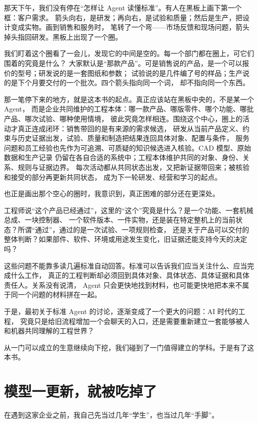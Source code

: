那天下午，我们没有停在“怎样让 Agent 读懂标准”。有人在黑板上画下第一个框：客户需求。
箭头向右，是研发；再向右，是试验和质量；然后是生产，把设计变成实物。画到销售和服务时，
笔转了一个弯——市场反馈和现场问题，箭头掉头指回研发。黑板上出现了一个圈。

我们盯着这个圈看了一会儿，发现它的中间是空的。每一个部门都在圈上，可它们围着的究竟是什么？
大家默认是“那款产品”。可是销售说的产品，是一个可以报价的型号；研发说的是一套图纸和参数；
试验说的是几件编了号的样品；生产说的是下个月要交付的一个批次。四个箭头指向同一个词，
却不指向同一个东西。

那一笔停下来的地方，就是这本书的起点。真正应该站在黑板中央的，不是某一个 Agent，
而是企业共同维护的工程本体：哪一款产品、哪版零件、哪个功能、哪批产品、哪次试验、哪种使用情境，
彼此究竟怎样相连。围绕这个中心，圈上的活动才真正连成闭环：销售带回的是有来源的需求候选，
研发从当前产品定义、约束与历史证据出发，试验、质量和制造把结果连回具体对象、配置与条件，
服务问题和员工经验也先作为可追溯、可质疑的知识候选进入核验。CAD 模型、原始数据和生产记录
仍留在各自合适的系统中；工程本体维护共同的对象、身份、关系、规则与证据边界。
每次活动都从共同状态出发，又把新证据带回来；被核验和接受的部分再更新共同状态，
成为下一轮研发、经营和学习的起点。

也正是画出那个空心的圈时，我意识到，真正困难的部分还在更深处。

工程师说“这个产品已经通过”，这里的“这个”究竟是什么？是一个功能、一套机械总成、一块控制器、
一个软件版本、一件实物，还是装在特定整机上的当前状态？所谓“通过”，通过的是一次试验、一项规则检查，
还是关于产品可以交付的整体判断？如果部件、软件、环境或用途发生变化，旧证据还能支持今天的决定吗？

这些问题不能靠多读几遍标准自动回答。标准可以告诉我们应当关注什么、应当完成什么工作，
真正的工程判断却必须回到具体对象、具体状态、具体证据和具体责任人。关系没有说清，
Agent 只会更快地找到材料，也可能更快地把本来不属于同一个问题的材料拼在一起。

于是，最初关于标准 Agent 的讨论，逐渐变成了一个更大的问题：AI 时代的工程，
究竟只是给旧流程增加一个会聊天的入口，还是需要重新建立一套能够被人和机器共同理解的工程世界？

从一门可以成立的生意继续向下挖，我们碰到了一门值得建立的学科。于是有了这本书。

\section*{模型一更新，就被吃掉了}

在遇到这家企业之前，我自己先当过几年“学生”，也当过几年“手脚”。

